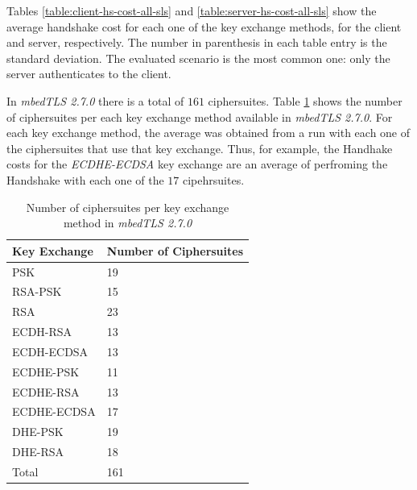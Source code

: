 Tables \ref{table:client-hs-cost-all-sls} and \ref{table:server-hs-cost-all-sls} show the average handshake cost for each one of the
key exchange methods, for the client and server, respectively. The number in parenthesis in each table entry is the standard deviation.
The evaluated scenario is the most common one: only the server authenticates to the client.

In \textit{mbedTLS 2.7.0} there is a total of $161$ ciphersuites. Table \ref{table:mbedtls-num-ciphers} shows the number of
ciphersuites per each key exchange method available in \textit{mbedTLS 2.7.0}. For each key exchange method, the average was obtained
from a run with each one of the ciphersuites that use that key exchange. Thus, for example, the Handhake costs for the \textit{ECDHE-ECDSA}
key exchange are an average of perfroming the Handshake with each one of the $17$ cipehrsuites.

\begin{table}[]
\begin{tabular}{ll}
\hline
\multicolumn{1}{|l|}{\textbf{Key Exchange}}                     & \multicolumn{1}{l|}{\textbf{Number of Ciphersuites}} \\ \hline
\multicolumn{1}{|l|}{PSK}         & \multicolumn{1}{l|}{19}                        \\ \hline
\multicolumn{1}{|l|}{RSA-PSK}     & \multicolumn{1}{l|}{15}                        \\ \hline
\multicolumn{1}{|l|}{RSA}         & \multicolumn{1}{l|}{23}                        \\ \hline
\multicolumn{1}{|l|}{ECDH-RSA}    & \multicolumn{1}{l|}{13}                        \\ \hline
\multicolumn{1}{|l|}{ECDH-ECDSA}  & \multicolumn{1}{l|}{13}                        \\ \hline
\multicolumn{1}{|l|}{ECDHE-PSK}   & \multicolumn{1}{l|}{11}                        \\ \hline
\multicolumn{1}{|l|}{ECDHE-RSA}   & \multicolumn{1}{l|}{13}                        \\ \hline
\multicolumn{1}{|l|}{ECDHE-ECDSA} & \multicolumn{1}{l|}{17}                        \\ \hline
\multicolumn{1}{|l|}{DHE-PSK}     & \multicolumn{1}{l|}{19}                        \\ \hline
\multicolumn{1}{|l|}{DHE-RSA}     & \multicolumn{1}{l|}{18}                        \\ \hline
Total                                      & 161
\end{tabular}
\centering
\centering \caption{\label{table:mbedtls-num-ciphers} Number of ciphersuites per key exchange method in \textit{mbedTLS 2.7.0}}
\end{table}

